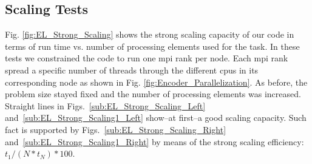 \documentclass[10pt,journal,compsoc]{IEEEtran}
\begin{document}
\subsection{ Scaling Tests}

Fig. \ref{fig:EL_Strong_Scaling} shows the strong scaling capacity of our code in terms of run time vs. number of processing elements used for the task. In these tests we constrained the code to run one \gls{mpi} rank per node. Each \gls{mpi} rank spread a specific number of threads through the different \glspl{cpu} in its corresponding node as shown in Fig. \ref{fig:Encoder_Parallelization}. As before, the problem size stayed fixed and the number of processing elements was increased. Straight lines in Figs.~\ref{sub:EL_Strong_Scaling_Left} and~\ref{sub:EL_Strong_Scaling1_Left} show--at first--a good scaling capacity. Such fact is supported by Figs.~\ref{sub:EL_Strong_Scaling_Right} and~\ref{sub:EL_Strong_Scaling1_Right} by means of the strong scaling efficiency: $t_1 / (N * t_N) * 100$.
\end{document}
